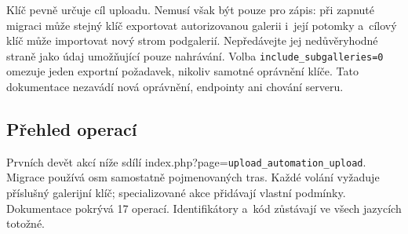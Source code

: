 \documentclass[11pt,a4paper]{article}
\newcommand{\codeword}[1]{\nolinkurl{#1}}
\begin{document}
Klíč pevně určuje cíl uploadu. Nemusí však být pouze pro zápis: při zapnuté migraci může
stejný klíč exportovat autorizovanou galerii i~její potomky a~cílový klíč může importovat
nový strom podgalerií. Nepředávejte jej nedůvěryhodné straně jako údaj umožňující pouze
nahrávání. Volba \codeword{include_subgalleries=0} omezuje jeden exportní požadavek, nikoliv
samotné oprávnění klíče. Tato dokumentace nezavádí nová oprávnění, endpointy ani chování
serveru.

\subsection{\texorpdfstring{Přehled operací}{Přehled operací}}

\label{api352:operation-index}

Prvních devět akcí níže sdílí index.php?page=\codeword{upload_automation_upload}. Migrace
používá osm samostatně pojmenovaných tras. Každé volání vyžaduje příslušný galerijní klíč;
specializované akce přidávají vlastní podmínky. Dokumentace pokrývá 17 operací.
Identifikátory a~kód zůstávají ve všech jazycích totožné.
\end{document}
